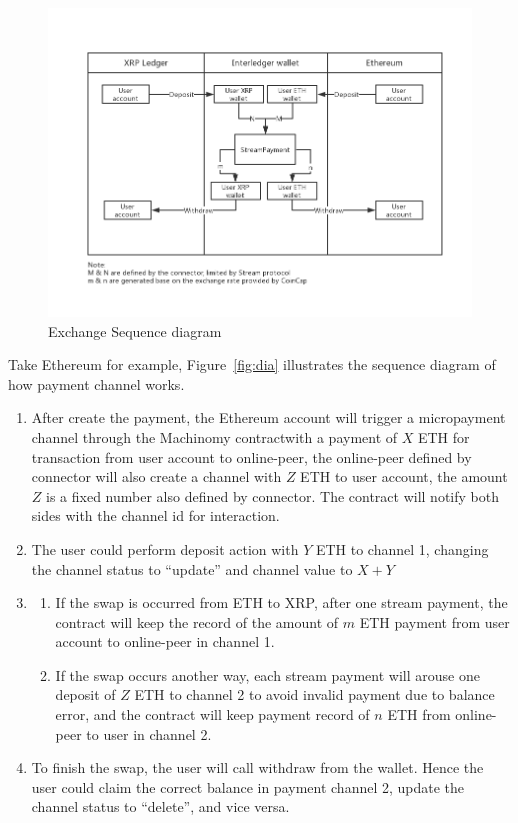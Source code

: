 \begin{figure}[H]
    \includegraphics[width=1\textwidth]{./figures/interledgerWallet}
        \centering
        \caption{Exchange Sequence diagram}
        \centering
        \label{fig:flow}

\end{figure}
\noindent Take Ethereum for example, Figure~\ref{fig:dia} illustrates the sequence diagram of how payment channel works.
\begin{enumerate}
    \item After create the payment, the Ethereum account will trigger a micropayment channel through the Machinomy contract\footnotemark[1] with a payment of $X$ ETH for transaction from user account to online-peer, the online-peer defined by connector will also create a channel with $Z$ ETH to user account, the amount $Z$ is a fixed number also defined by connector. The contract will notify both sides with the channel id for interaction.
    \item The user could perform deposit action with $Y$ ETH to channel 1, changing the channel status to ``update'' and channel value to $X+Y$
    \item \begin{enumerate}
    \item If the swap is occurred from ETH to XRP, after one stream payment, the contract will keep the record of the amount of $m$ ETH payment from user account to online-peer in channel 1.
    \item If the swap occurs another way, each stream payment will arouse one deposit of $Z$ ETH to channel 2 to avoid invalid payment due to balance error, and the contract will keep payment record of $n$ ETH from online-peer to user in channel 2.
     \end{enumerate}
     \item To finish the swap, the user will call withdraw from the wallet. Hence the user could claim the correct balance in payment channel 2, update the channel status to ``delete'', and vice versa.
\end{enumerate}
